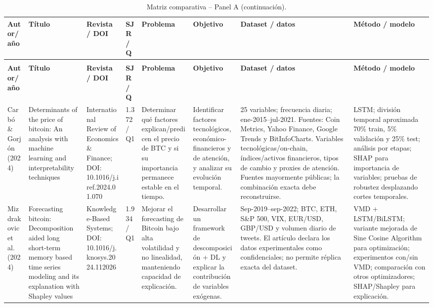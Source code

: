 \documentclass[11pt,letterpaper]{article}
\begin{document}
{\pagestyle{plain}
\begin{landscape}
\thispagestyle{plain}
\scriptsize
\setlength{\tabcolsep}{3.2pt}
\renewcommand{\arraystretch}{1.28}
\begin{longtable}{p{1.55cm} p{2.8cm} p{2.9cm} p{1.25cm} p{2.8cm} p{2.8cm} p{4.0cm} p{3.6cm}}
\caption{Matriz comparativa -- Panel A: identificación, problema, objetivo, datos y metodología.}\\
\toprule
\textbf{Autor/año} & \textbf{Título} & \textbf{Revista / DOI} & \textbf{SJR / Q} & \textbf{Problema} & \textbf{Objetivo} & \textbf{Dataset / datos} & \textbf{Método / modelo} \\
\midrule
\endfirsthead
\caption[]{Matriz comparativa -- Panel A (continuación).}\\
\toprule
\textbf{Autor/año} & \textbf{Título} & \textbf{Revista / DOI} & \textbf{SJR / Q} & \textbf{Problema} & \textbf{Objetivo} & \textbf{Dataset / datos} & \textbf{Método / modelo} \\
\midrule
\endhead

Carbó \& Gorjón (2024) &
Determinants of the price of bitcoin: An analysis with machine learning and interpretability techniques &
International Review of Economics \& Finance; DOI: 10.1016/j.iref.2024.01.070 &
1.372 / Q1 &
Determinar qué factores explican/predicen el precio de BTC y si su importancia permanece estable en el tiempo. &
Identificar factores tecnológicos, económico-financieros y de atención, y analizar su evolución temporal. &
25 variables; frecuencia diaria; ene-2015--jul-2021. Fuentes: Coin Metrics, Yahoo Finance, Google Trends y BitInfoCharts. Variables tecnológicas/on-chain, índices/activos financieros, tipos de cambio y proxies de atención. Fuentes mayormente públicas; la combinación exacta debe reconstruirse. &
LSTM; división temporal aproximada 70\% train, 5\% validación y 25\% test; análisis por etapas; SHAP para importancia de variables; pruebas de robustez desplazando cortes temporales. \\
\midrule

Mizdrakovic et al. (2024) &
Forecasting bitcoin: Decomposition aided long short-term memory based time series modeling and its explanation with Shapley values &
Knowledge-Based Systems; DOI: 10.1016/j.knosys.2024.112026 &
1.934 / Q1 &
Mejorar el forecasting de Bitcoin bajo alta volatilidad y no linealidad, manteniendo capacidad de explicación. &
Desarrollar un framework de descomposición + DL y explicar la contribución de variables exógenas. &
Sep-2019--sep-2022; BTC, ETH, S\&P 500, VIX, EUR/USD, GBP/USD y volumen diario de tweets. El artículo declara los datos experimentales como confidenciales; no permite réplica exacta del dataset. &
VMD + LSTM/BiLSTM; variante mejorada de Sine Cosine Algorithm para optimización; experimentos con/sin VMD; comparación con otros optimizadores; SHAP/Shapley para explicación. \\
\midrule


\end{longtable}
\end{landscape}}
\end{document}
